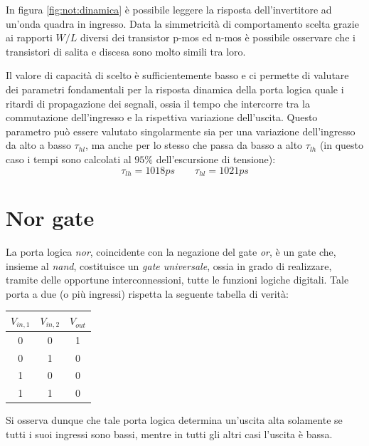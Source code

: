 		In figura \ref{fig:not:dinamica} è possibile leggere la risposta dell'invertitore ad un'onda quadra in ingresso. Data la simmetricità di comportamento scelta grazie ai rapporti $W/L$ diversi dei transistor p-mos ed n-mos è possibile osservare che i transistori di salita e discesa sono molto simili tra loro.
		
		Il valore di capacità di scelto è sufficientemente basso e ci permette di valutare dei parametri fondamentali per la risposta dinamica della porta logica quale i ritardi di propagazione dei segnali, ossia il tempo che intercorre tra la commutazione dell'ingresso e la rispettiva variazione dell'uscita. Questo parametro può essere valutato singolarmente sia per una variazione dell'ingresso da alto a basso $\tau_{hl}$, ma anche per lo stesso che passa da basso a alto $\tau_{lh}$ (in questo caso i tempi sono calcolati al $95\%$ dell'escursione di tensione):
		\[ \tau_{lh} = 1018ps \qquad \tau_{hl} = 1021ps  \] 



\section{Nor gate}
	La porta logica \textit{nor}, coincidente con la negazione del gate \textit{or}, è un gate che, insieme al \textit{nand}, costituisce un \textit{gate universale}, ossia in grado di realizzare, tramite delle opportune interconnessioni, tutte le funzioni logiche digitali. Tale porta a due (o più ingressi) rispetta la seguente tabella di verità:
	\begin{center}
		\begin{tabular}{c c | c}
			$V_{in,1}$ & $V_{in,2}$ & $V_{out}$ \\ \hline
			0 & 0 & 1 \\
			0 & 1 & 0 \\
			1 & 0 & 0 \\
			1 & 1 & 0 \\
		\end{tabular}
	\end{center}
	Si osserva dunque che tale porta logica determina un'uscita alta solamente se tutti i suoi ingressi sono bassi, mentre in tutti gli altri casi l'uscita è bassa.
	
